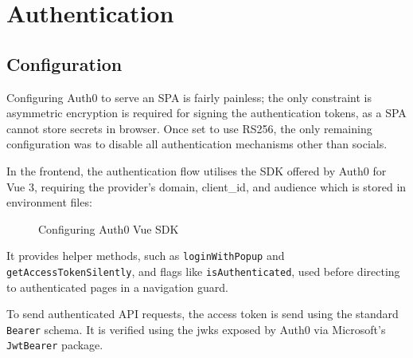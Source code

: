 \section{Authentication}

\subsection{Configuration}

Configuring Auth0 to serve an SPA is fairly painless; the
only constraint is asymmetric encryption is required for
signing the authentication tokens, as a SPA cannot store
secrets in browser.
Once set to use RS256, the only remaining configuration was
to disable all authentication mechanisms other than
socials.

In the frontend, the authentication flow utilises the SDK
offered by Auth0 for Vue 3, requiring the provider's
domain, client\_id, and audience which is stored in
environment files: 

\begin{figure}[H] 

  \centering 

  \codesize

  

  \caption{Configuring Auth0 Vue SDK} 

\end{figure} 

It provides helper methods, such as
\lstinline{loginWithPopup} and
\lstinline{getAccessTokenSilently}, and flags like
\lstinline{isAuthenticated}, used before directing to
authenticated pages in a navigation guard.

To send authenticated API requests, the access token is
send using the standard \lstinline{Bearer} schema.
It is verified using the \gls{jwks} exposed by Auth0 via
Microsoft's \lstinline{JwtBearer} package.

